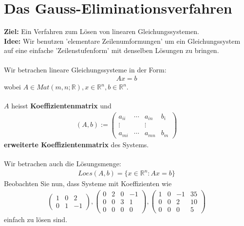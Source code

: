\documentclass[11pt]{report}
\newcommand*\Zb[1] {\mathbb{#1}}
\newcommand*\f[1] {\textbf{#1}}
\begin{document}
\section{Das Gauss-Eliminationsverfahren}
\f{Ziel:} Ein Verfahren zum Lösen von linearen Gleichungssystemen.\\
\f{Idee:} Wir benutzen 'elementare Zeilenumformungen' um ein Gleichungssystem auf eine einfache 'Zeilenstufenform' mit denselben Lösungen zu bringen.\\\\
Wir betrachen lineare Gleichungssysteme in der Form:
\begin{align}
 Ax = b
\end{align}
wobei $A \in Mat(m, n; \Zb{R}), x \in \Zb{R}^n, b \in \Zb{R}^n$.\\\\
$A$ heisst \f{Koeffizientenmatrix} und 
\begin{align}
(A, b):= \begin{pmatrix} a_{ii} & \cdots & a_{in} & b_{i} \\ \vdots & & \vdots & \\ a_{mi} & \cdots & a_{mn} & b_{m}\end{pmatrix} 
\end{align}
\f{erweiterte Koeffizientenmatrix} des Systems.\\\\
Wir betrachen auch die Lösungsmenge:
\begin{align}
 Loes(A, b) = \{x \in \Zb{R}^n: Ax=b\}
\end{align}
Beobachten Sie nun, dass Systeme mit Koeffizienten wie
\begin{align}
 \begin{pmatrix} 1 & 0 & 2 \\ 0 & 1 & -1 \end{pmatrix},  
 \begin{pmatrix} 0 & 2 & 0 & -1 \\ 0 & 0 & 3 & 1 \\ 0 & 0 & 0 & 0 \end{pmatrix}, 
 \begin{pmatrix} 1 & 0 & -1 & 35 \\ 0 & 0 & 2 & 10 \\ 0 & 0 & 0 & 5 \end{pmatrix}
\end{align}
einfach zu lösen sind.
\end{document}
